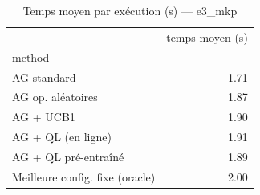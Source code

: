 \begin{table}
\caption{Temps moyen par exécution (s) — e3_mkp}
\label{tab:temps}
\begin{tabular}{lr}
\toprule
 & temps moyen (s) \\
method &  \\
\midrule
AG standard & 1.71 \\
AG op. aléatoires & 1.87 \\
AG + UCB1 & 1.90 \\
AG + QL (en ligne) & 1.91 \\
AG + QL pré-entraîné & 1.89 \\
Meilleure config. fixe (oracle) & 2.00 \\
\bottomrule
\end{tabular}
\end{table}
